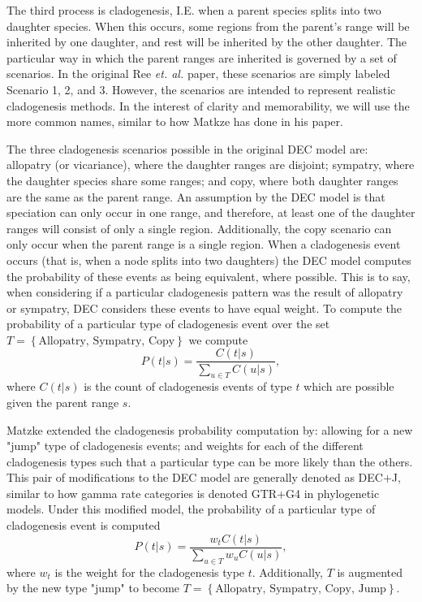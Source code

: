 \documentclass{article}
\begin{document}
The third process is cladogenesis, I.E. when a parent species splits into two
daughter species.
When this occurs, some regions from the parent's range will be inherited by one
daughter, and rest will be inherited by the other daughter.
The particular way in which the parent ranges are inherited is governed by a
set of scenarios.
In the original Ree \textit{et. al.}\cite{ALikelihoodFrReeR2005} paper, these
scenarios are simply labeled Scenario 1, 2, and 3.
However, the scenarios are intended to represent realistic cladogenesis
methods.
In the interest of clarity and memorability, we will use the more common names,
similar to how Matkze \cite{ModelSelectionMatzke2014} has done in his paper.

The three cladogenesis scenarios possible in the original DEC model are:
allopatry (or vicariance), where the daughter ranges are disjoint; sympatry,
where the daughter species share some ranges; and copy, where both daughter
ranges are the same as the parent range.
An assumption by the DEC model is that speciation can only occur in one range,
and therefore, at least one of the daughter ranges will consist of only a
single region.
Additionally, the copy scenario can only occur when the parent range is a
single region.
When a cladogenesis event occurs (that is, when a node splits into two
daughters) the DEC model computes the probability of these events as being
equivalent, where possible.
This is to say, when considering if a particular cladogenesis pattern was the
result of allopatry or sympatry, DEC considers these events to have equal
weight.
To compute the probability of a particular type of cladogenesis event over the
set \(T = \left\{\text{Allopatry, Sympatry, Copy}\right\}\) we compute
\[
	P(t |
	s) = \frac{C(t | s)}{\sum_{u \in T} C(u | s)},
\]
where \( C(t|s) \) is the
count of cladogenesis events of type $ t $ which are possible given the parent
range \( s \).

Matzke\cite{ModelSelectionMatzke2014} extended the cladogenesis probability
computation by: allowing for a new "jump" type of cladogenesis events; and
weights for each of the different cladogenesis types such that a particular
type can be more likely than the others.
This pair of modifications to the DEC model are generally denoted as DEC+J,
similar to how gamma rate categories is denoted GTR+G4 in phylogenetic models.
Under this modified model, the probability of a particular type of cladogenesis
event is computed
\[
	P(t | s) = \frac{w_t C(t | s)}{\sum_{u \in T} w_u C(u |
		s)},
\]
where $w_t$ is the weight for the cladogenesis type $t$.
Additionally, $T$ is augmented by the new type "jump" to become \(T =
\left\{\text{Allopatry, Sympatry, Copy, Jump}\right\} \).
\end{document}
